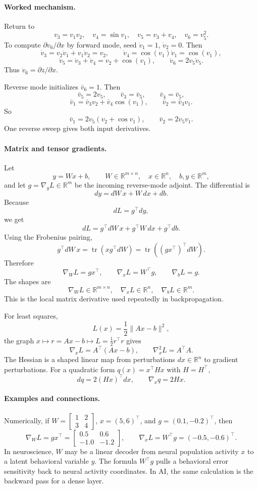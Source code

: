 \paragraph{Worked mechanism.}
Return to
\[
v_3=v_1v_2,\quad v_4=\sin v_1,\quad v_5=v_3+v_4,\quad v_6=v_5^2.
\]
To compute \(\partial v_6/\partial x\) by forward mode, seed \(\dot v_1=1\), \(\dot v_2=0\). Then
\[
\dot v_3=v_2\dot v_1+v_1\dot v_2=v_2,\qquad
\dot v_4=\cos(v_1)\dot v_1=\cos(v_1),
\]
\[
\dot v_5=\dot v_3+\dot v_4=v_2+\cos(v_1),\qquad
\dot v_6=2v_5\dot v_5.
\]
Thus \(\dot v_6=\partial z/\partial x\).

Reverse mode initializes \(\bar v_6=1\). Then
\[
\bar v_5=2v_5,\qquad
\bar v_3=\bar v_5,\qquad
\bar v_4=\bar v_5,
\]
\[
\bar v_1=\bar v_3v_2+\bar v_4\cos(v_1),\qquad
\bar v_2=\bar v_3v_1.
\]
So
\[
\bar v_1=2v_5(v_2+\cos v_1),\qquad
\bar v_2=2v_5v_1.
\]
One reverse sweep gives both input derivatives.

\paragraph{Matrix and tensor gradients.}
Let
\[
y=Wx+b,\qquad
W\in\mathbb{R}^{m\times n},\quad x\in\mathbb{R}^n,\quad b,y\in\mathbb{R}^m,
\]
and let \(g=\nabla_y L\in\mathbb{R}^m\) be the incoming reverse-mode adjoint. The differential is
\[
dy=dW\,x+W\,dx+db.
\]
Because
\[
dL=g^\top dy,
\]
we get
\[
dL=g^\top dW\,x+g^\top W\,dx+g^\top db.
\]
Using the Frobenius pairing,
\[
g^\top dW\,x
=\operatorname{tr}(xg^\top dW)
=\operatorname{tr}((gx^\top)^\top dW).
\]
Therefore
\[
\boxed{\nabla_W L=gx^\top,\qquad \nabla_x L=W^\top g,\qquad \nabla_b L=g.}
\]
The shapes are
\[
\nabla_W L\in\mathbb{R}^{m\times n},\quad
\nabla_x L\in\mathbb{R}^n,\quad
\nabla_b L\in\mathbb{R}^m.
\]
This is the local matrix derivative used repeatedly in backpropagation.

For least squares,
\[
L(x)=\frac12\|Ax-b\|^2,
\]
the graph \(x\mapsto r=Ax-b\mapsto L=\frac12 r^\top r\) gives
\[
\nabla_x L=A^\top(Ax-b),\qquad
\nabla_x^2L=A^\top A.
\]
The Hessian is a shaped linear map from perturbations \(dx\in\mathbb{R}^n\) to gradient perturbations. For a quadratic form \(q(x)=x^\top Hx\) with \(H=H^\top\),
\[
dq=2(Hx)^\top dx,
\qquad
\nabla_x q=2Hx.
\]

\paragraph{Examples and connections.}
Numerically, if \(W=\begin{bmatrix}1&2\\3&4\end{bmatrix}\), \(x=(5,6)^\top\), and \(g=(0.1,-0.2)^\top\), then
\[
\nabla_W L=gx^\top=
\begin{bmatrix}
0.5&0.6\\
-1.0&-1.2
\end{bmatrix},
\qquad
\nabla_x L=W^\top g=(-0.5,-0.6)^\top.
\]
In neuroscience, \(W\) may be a linear decoder from neural population activity \(x\) to a latent behavioral variable \(y\). The formula \(W^\top g\) pulls a behavioral error sensitivity back to neural activity coordinates. In AI, the same calculation is the backward pass for a dense layer.

